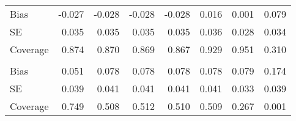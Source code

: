 \begin{table}
\begin{tabular}[t]{lddddddd}
\hspace{1em}Bias & -0.027 & -0.028 & -0.028 & -0.028 & 0.016 & 0.001 & 0.079\\
\hspace{1em}SE & 0.035 & 0.035 & 0.035 & 0.035 & 0.036 & 0.028 & 0.034\\
\hspace{1em}Coverage & 0.874 & 0.870 & 0.869 & 0.867 & 0.929 & 0.951 & 0.310\\
\addlinespace[0.3em]
\\
\hspace{1em}Bias & 0.051 & 0.078 & 0.078 & 0.078 & 0.078 & 0.079 & 0.174\\
\hspace{1em}SE & 0.039 & 0.041 & 0.041 & 0.041 & 0.041 & 0.033 & 0.039\\
\hspace{1em}Coverage & 0.749 & 0.508 & 0.512 & 0.510 & 0.509 & 0.267 & 0.001\\
\bottomrule
\end{tabular}
\end{table}
